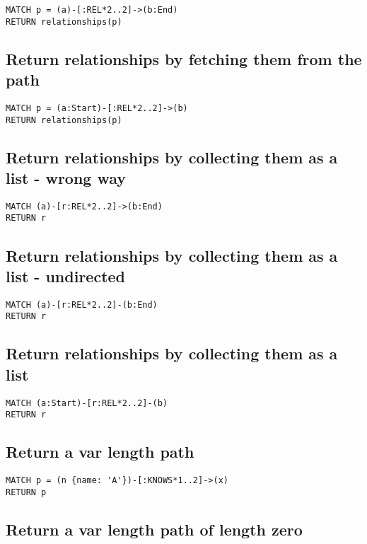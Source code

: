 \begin{lstlisting}
MATCH p = (a)-[:REL*2..2]->(b:End)
RETURN relationships(p)
\end{lstlisting}

\subsection{Return relationships by fetching them from the path}

\begin{lstlisting}
MATCH p = (a:Start)-[:REL*2..2]->(b)
RETURN relationships(p)
\end{lstlisting}

\subsection{Return relationships by collecting them as a list - wrong way}

\begin{lstlisting}
MATCH (a)-[r:REL*2..2]->(b:End)
RETURN r
\end{lstlisting}

\subsection{Return relationships by collecting them as a list - undirected}

\begin{lstlisting}
MATCH (a)-[r:REL*2..2]-(b:End)
RETURN r
\end{lstlisting}

\subsection{Return relationships by collecting them as a list}

\begin{lstlisting}
MATCH (a:Start)-[r:REL*2..2]-(b)
RETURN r
\end{lstlisting}

\subsection{Return a var length path}

\begin{lstlisting}
MATCH p = (n {name: 'A'})-[:KNOWS*1..2]->(x)
RETURN p
\end{lstlisting}

\subsection{Return a var length path of length zero}

